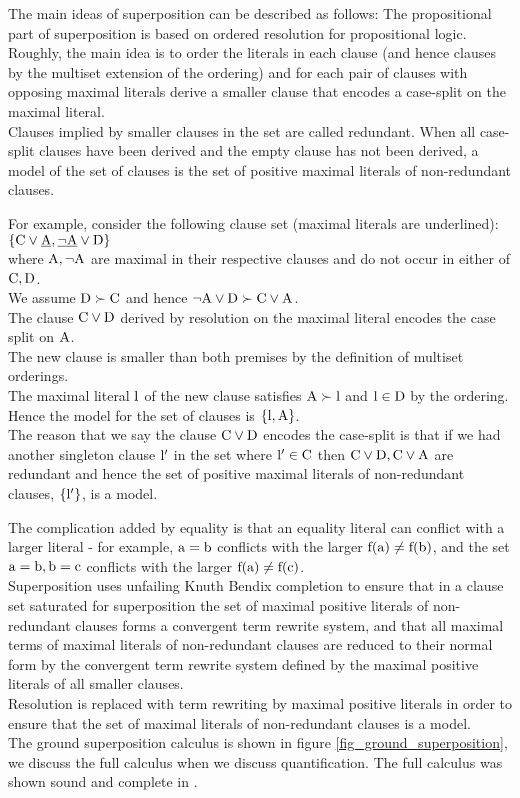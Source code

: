 \noindent
The main ideas of superposition can be described as follows:
The propositional part of superposition is based on ordered resolution for propositional logic.
Roughly, the main idea is to order the literals in each clause (and hence clauses by the multiset extension of the ordering) and for each pair of clauses with opposing maximal literals derive a smaller clause that encodes a case-split on the maximal literal.\\
Clauses implied by smaller clauses in the set are called redundant. When all case-split clauses have been derived and the empty clause has not been derived, a model of the set of clauses is the set of positive maximal literals of non-redundant clauses.

\noindent
For example, consider the following clause set (maximal literals are underlined):\\
$\left\{\mathrm{C \lor \underline{A}, \underline{\lnot A} \lor D}\right\}$ \\
where $\mathrm{A,\lnot A}$ are maximal in their respective clauses and do not occur in either of $\mathrm{C,D}$.\\
We assume $\mathrm{D \succ C}$ and hence $\mathrm{\lnot A \lor D \succ C \lor A}$.\\
The clause $\mathrm{C\lor D}$ derived by resolution on the maximal literal encodes the case split on $\mathrm{A}$.\\
The new clause is smaller than both premises by the definition of multiset orderings.\\
The maximal literal $\mathrm{l}$ of the new clause satisfies $\mathrm{A \succ l}$ and $\mathrm{l \in D}$ by the ordering.\\
Hence the model for the set of clauses is $\left\{\mathrm{l,A}\right\}$.\\
The reason that we say the clause $\mathrm{C \lor D}$ encodes the case-split is that if we had another singleton clause $\mathrm{l'}$ in the set where $\mathrm{l' \in C}$ then $\mathrm{C \lor D,C \lor A}$ are redundant and hence the set of positive maximal literals of non-redundant clauses, $\left\{\mathrm{l'}\right\}$, is a model.

\noindent
The complication added by equality is that an equality literal can conflict with a larger literal - for example, $\mathrm{a=b}$ conflicts with the larger $\mathrm{f(a)\neq f(b)}$, and the set $\mathrm{a=b,b=c}$ conflicts with the larger $\mathrm{f(a)\neq f(c)}$.\\
Superposition uses unfailing Knuth Bendix completion to ensure that in a clause set saturated for superposition the set of maximal positive literals of non-redundant clauses forms a convergent term rewrite system, and that all maximal terms of maximal literals of non-redundant clauses are reduced to their normal form by the  convergent term rewrite system defined by the maximal positive literals of all smaller clauses.\\
Resolution is replaced with term rewriting by maximal positive literals in order to ensure that the set of maximal literals of non-redundant clauses is a model.\\
The ground superposition calculus is shown in figure \ref{fig_ground_superposition}, we discuss the full calculus when we discuss quantification. The full calculus was shown sound and complete in \cite{BachmairGanzinger94}.

